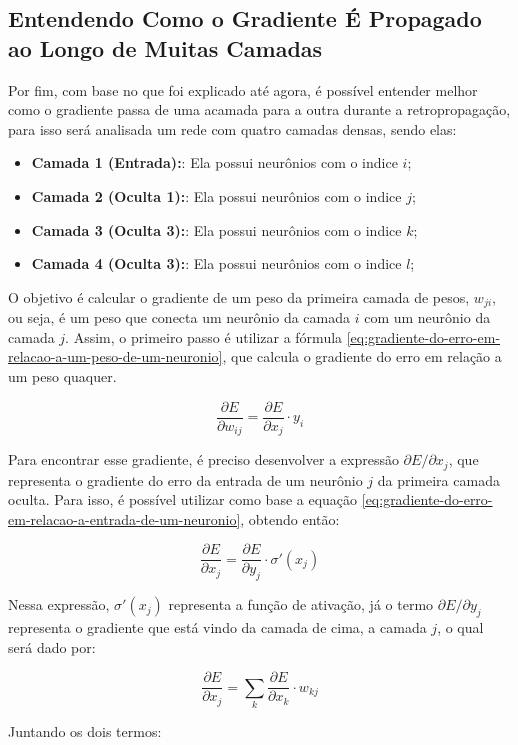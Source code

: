 \subsection{Entendendo Como o Gradiente É Propagado ao Longo de Muitas Camadas}

Por fim, com base no que foi explicado até agora, é possível entender melhor como o gradiente passa de uma acamada para a outra durante a retropropagação, para isso será analisada um rede com quatro camadas densas, sendo elas:

\begin{itemize}
    \item \textbf{Camada 1 (Entrada):}: Ela possui neurônios com o indice $i$;
    \item \textbf{Camada 2 (Oculta 1):}: Ela possui neurônios com o indice $j$;
    \item \textbf{Camada 3 (Oculta 3):}: Ela possui neurônios com o indice $k$;
    \item \textbf{Camada 4 (Oculta 3):}: Ela possui neurônios com o indice $l$;
\end{itemize}

O objetivo é calcular o gradiente de um peso da primeira camada de pesos, $w_{ji}$, ou seja, é um peso que conecta um neurônio da camada $i$ com um neurônio da camada $j$. Assim, o primeiro passo é utilizar a fórmula \ref{eq:gradiente-do-erro-em-relacao-a-um-peso-de-um-neuronio}, que calcula o gradiente do erro em relação a um peso quaquer.

\[
    \frac{\partial E}{\partial w_{ij}} = \frac{\partial E}{\partial x_j} \cdot y_i
\]

Para encontrar esse gradiente, é preciso desenvolver a expressão $\partial E / \partial x_j$, que representa o gradiente do erro da entrada de um neurônio $j$ da primeira camada oculta. Para isso, é possível utilizar como base a equação \ref{eq:gradiente-do-erro-em-relacao-a-entrada-de-um-neuronio}, obtendo então:

\[
    \frac{\partial E}{\partial x_j} = \frac{\partial E}{\partial y_j} \cdot \sigma'(x_j)
\]

Nessa expressão, $\sigma'(x_j)$ representa a função de ativação, já o termo $\partial E / \partial y_j$ representa o gradiente que está vindo da camada de cima, a camada $j$, o qual será dado por:

\[
    \frac{\partial E}{\partial x_j} = \sum_k \frac{\partial E}{\partial x_k} \cdot w_{kj}
\]

Juntando os dois termos:

